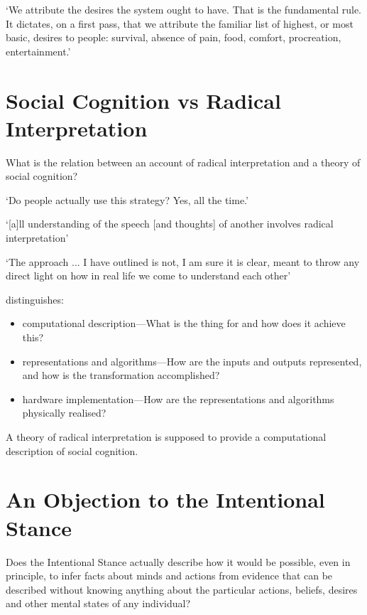 \documentclass[12pt]{extarticle}
\begin{document}
\begin{multicols*}{3}
‘We attribute the desires the system ought to have. That is the fundamental rule. It dictates, on a first pass, that we attribute the familiar list of highest, or most basic, desires to people: survival, absence of pain, food, comfort, procreation, entertainment.’ \citep[p.~20]{Dennett:1987sf}



\section{Social Cognition vs Radical Interpretation}

What is the relation between an account of radical interpretation
and a theory of social cognition?

‘Do people actually use this strategy? Yes, all the time.’
\citep[p.~21]{Dennett:1987sf}

‘[a]ll understanding of the speech  [and thoughts] of another involves radical interpretation’
\citep[p.~125]{Davidson:1973jx}

‘The approach ... I have outlined is not, I am sure it is clear, meant to throw any direct light on how in real life we come to understand each other’
\citep[p.~12]{Davidson:1980xp}

\citet[p.~22ff]{Marr:1982kx} distinguishes:

\begin{itemize}

\item computational description---What is the thing for and how does it achieve this?

\item representations and algorithms---How are the inputs and outputs represented, and how is the transformation accomplished?

\item hardware implementation---How are the representations and algorithms physically realised?

\end{itemize}

A theory of radical interpretation is supposed to provide
a computational description of social cognition.



\section{An Objection to the Intentional Stance}

Does the Intentional Stance actually describe how it would be possible,
even in principle, to infer facts about minds and actions from
evidence that can
be described without knowing anything about the particular actions, beliefs, desires and
other mental states of any individual?


\end{multicols*}
\end{document}
